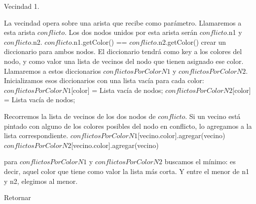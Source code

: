 \begin{algorithm}[H]
\caption{Vecindad 1.}
\label{vecindad1 pseudocode}
\begin{algorithmic}[1] 
\STATE La vecindad opera sobre una arista que recibe como parámetro. Llamaremos a esta arista $conflicto$. Los dos nodos unidos por esta arista serán $conflicto$.n1 y $conflicto$.n2.
\REQUIRE $conflicto$.n1.getColor() == $conflicto$.n2.getColor()
\STATE crear un diccionario para ambos nodos. El diccionario tendrá como key a los colores del nodo, y como valor una lista de vecinos del nodo que tienen asignado ese color. Llamaremos a estos diccionarios $conflictosPorColorN1$ y $conflictosPorColorN2$. Inicializamos esos diccionarios con una lista vacía para cada color:
    \STATE $conflictosPorColorN1$[color] = Lista vacía de nodos;
\ENDFOR
{}
    \STATE $conflictosPorColorN2$[color] = Lista vacía de nodos;
\ENDFOR

\STATE Recorremos la lista de vecinos de los dos nodos de $conflicto$. Si un vecino está pintado con alguno de los colores posibles del nodo en conflicto, lo agregamos a la lista correspondiente.
	\STATE $conflictosPorColorN1$[vecino.color].agregar(vecino)
    \ENDIF
\ENDFOR
{}
	\STATE $conflictosPorColorN2$[vecino.color].agregar(vecino)
    \ENDIF
\ENDFOR

\STATE para $conflictosPorColorN1$ y $conflictosPorColorN2$ buscamos el mínimo: es decir, aquel color que tiene como valor la lista más corta. Y entre el menor de n1 y n2, elegimos al menor.

\STATE 




\STATE Retornar
\end{algorithmic}
\end{algorithm}
\leavevmode


 


